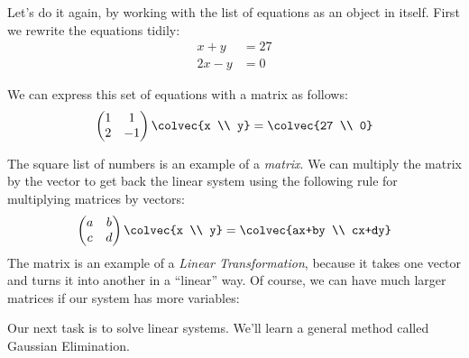 Let's do it again, by working with the list of equations as an object in itself.  First we rewrite the equations tidily:
\begin{align*}
	x+y & = 27 \\
	2x-y & = 0
\end{align*}

We can express this set of equations with a matrix as follows:
\begin{equation*}
    \begin{pmatrix}
      1             &1  \\
      2             &-1
    \end{pmatrix}
  \colvec{x \\ y}
  =
  \colvec{27 \\ 0}
\end{equation*}

The square list of numbers is an example of a \emph{matrix}.  We can multiply the matrix by the vector to get back the linear system using the following rule for multiplying matrices by vectors:
\begin{equation}\label{2x2multiplication}
    \begin{pmatrix}
      a             &b  \\
      c             &d
    \end{pmatrix}
  \colvec{x \\ y}
  =
  \colvec{ax+by \\ cx+dy}
\end{equation}
\noindent
The matrix is an example of a \emph{Linear Transformation}, because it takes one vector and turns it into another in a ``linear'' way.
Of course, we can have much larger matrices if our system has more variables:



Our next task is to solve linear systems. We'll learn a general method called Gaussian Elimination.








\newpage
